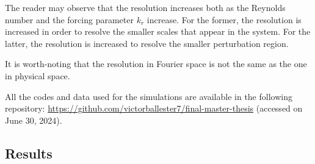 \documentclass[../main.tex]{subfiles}
\begin{document}
The reader may observe that the resolution increases both as the Reynolds number and the forcing parameter $k_r$ increase. For the former, the resolution is increased in order to resolve the smaller scales that appear in the system. For the latter, the resolution is increased to resolve the smaller perturbation region.

It is worth-noting that the resolution in Fourier space is not the same as the one in physical space.

All the codes and data used for the simulations are available in the following repository: \url{https://github.com/victorballester7/final-master-thesis} (accessed on June 30, 2024).

\subsection{Results}\label{sec:results}
\end{document}
